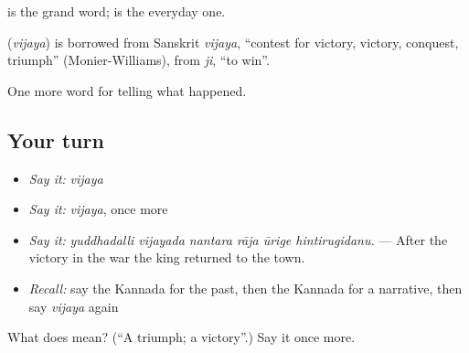  is the grand word;  is the everyday one.

\begin{cousinweb}
\textbf{} (\emph{vijaya}) is borrowed from Sanskrit \emph{vijaya}, \textquotedblleft{}contest for victory, victory, conquest, triumph\textquotedblright{} (Monier-Williams), from \emph{ji}, \textquotedblleft{}to win\textquotedblright{}.
\end{cousinweb}

\begin{grammarlens}[title={What you've built}]
One more word for telling what happened.
\end{grammarlens}

\subsection*{Your turn}
\begin{itemize}
\raggedright
  \item \emph{Say it:} \emph{vijaya}
  \item \emph{Say it:} \emph{vijaya}, once more
  \item \emph{Say it:} \emph{yuddhadalli vijayada nantara rāja ūrige hintirugidanu.} — After the victory in the war the king returned to the town.
  \item \emph{Recall:} say the Kannada for the past, then the Kannada for a narrative, then say \emph{vijaya} again
\end{itemize}

\begin{tcolorbox}[breakable,colback=teal!4,colframe=teal!35!black,title={Before you move on}]
What does  mean? (\textquotedblleft{}A triumph; a victory\textquotedblright{}.) Say it once more.
\end{tcolorbox}
